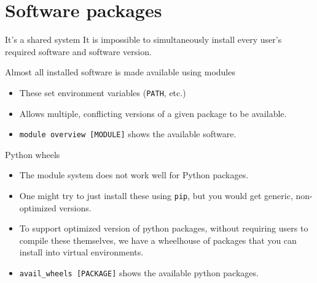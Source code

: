 \documentclass[
  10pt,
  ignorenonframetext,
  aspectratio=169]{beamer}
\begin{document}
\section{Software packages}\label{software-packages}

\begin{frame}[fragile]{It's a shared system}
\label{its-a-shared-system}
It is impossible to simultaneously install every user's required software and software version.

\pause

\begin{block}{Almost all installed software is made available using modules}\setlength{\parskip}{0.5\baselineskip}
\label{almost-all-installed-software-is-made-available-using-modules}
\pause

\begin{itemize}
\item
  These set environment variables (\texttt{PATH}, etc.)

  \pause
\item
  Allows multiple, conflicting versions of a given package to be available.

  \pause
\item
  \alert{\texttt{module\ overview\ {[}MODULE{]}}} shows the available software.
\end{itemize}

\pause
\end{block}

\begin{block}{Python wheels}\setlength{\parskip}{0.5\baselineskip}
\label{python-wheels}
\begin{itemize}
\item
  The module system does not work well for Python packages.

  \pause
\item
  One might try to just install these using \texttt{pip}, but you would get generic, non-optimized versions.

  \pause
\item
  To support optimized version of python packages, without requiring users to compile these themselves, we have a \alert{wheelhouse} of packages that you can install into \alert{virtual environments}.

  \pause
\item
  \alert{\texttt{avail\_wheels\ {[}PACKAGE{]}}} shows the available python packages.
\end{itemize}
\end{block}
\end{frame}
\end{document}
